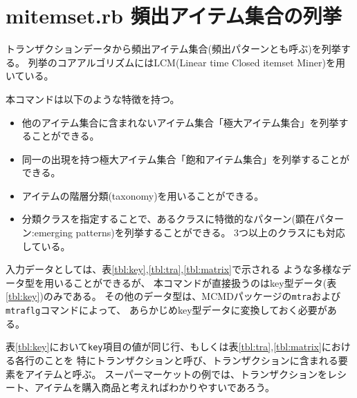 
\section{mitemset.rb 頻出アイテム集合の列挙\label{sect:mitemset}}

トランザクションデータから頻出アイテム集合(頻出パターンとも呼ぶ)を列挙する。
列挙のコアアルゴリズムにはLCM(Linear time Closed itemset Miner)を用いている\cite{Uno2004,UnoWeb}。

本コマンドは以下のような特徴を持つ。
\begin{itemize}
 \item 他のアイテム集合に含まれないアイテム集合「極大アイテム集合」を列挙することができる。
 \item 同一の出現を持つ極大アイテム集合「飽和アイテム集合」を列挙することができる。
 \item アイテムの階層分類(taxonomy)を用いることができる。
 \item 分類クラスを指定することで、あるクラスに特徴的なパターン(顕在パターン:emerging patterns)を列挙することができる。
3つ以上のクラスにも対応している。
\end{itemize}

入力データとしては、表\ref{tbl:key},\ref{tbl:tra},\ref{tbl:matrix}で示される
ような多様なデータ型を用いることができるが、
本コマンドが直接扱うのはkey型データ(表\ref{tbl:key})のみである。
その他のデータ型は、MCMDパッケージの\verb|mtra|および\verb|mtraflg|コマンドによって、
あらかじめkey型データに変換しておく必要がある。

表\ref{tbl:key}において\verb|key|項目の値が同じ行、もしくは表\ref{tbl:tra},\ref{tbl:matrix}における各行のことを
特にトランザクションと呼び、トランザクションに含まれる要素をアイテムと呼ぶ。
スーパーマーケットの例では、トランザクションをレシート、アイテムを購入商品と考えればわかりやすいであろう。

